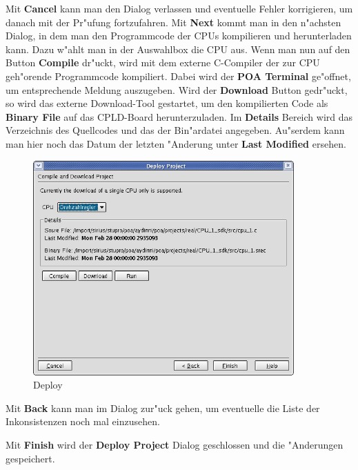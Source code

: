 \documentclass[a4paper,titlepage,12pt,ngerman]{scrbook}
\begin{document}
Mit {\bf Cancel} kann man den Dialog verlassen und eventuelle Fehler korrigieren, um danach mit der Pr"ufung fortzufahren.\newline
Mit {\bf Next} kommt man in den n"achsten Dialog, in dem man den Programmcode der CPUs kompilieren und herunterladen kann. Dazu w"ahlt man in der Auswahlbox die CPU aus. Wenn man nun auf den Button {\bf Compile} dr"uckt, wird mit dem externe C-Compiler der zur CPU geh"orende Programmcode kompiliert. Dabei wird der {\bf POA Terminal} ge"offnet, um entsprechende Meldung auszugeben. Wird der {\bf Download} Button gedr"uckt, so wird das externe Download-Tool gestartet, um den kompilierten Code als {\bf Binary File} auf das CPLD-Board herunterzuladen.
Im {\bf Details} Bereich wird das Verzeichnis des Quellcodes und das der Bin"ardatei angegeben. Au"serdem kann man hier noch das Datum der letzten "Anderung unter {\bf Last Modified} ersehen.\par
\begin{figure}[htbp]

\begin{center}

\includegraphics[width=10cm]{Deploy2}

\caption{Deploy}\label{test}

\end{center}
\end{figure}
Mit {\bf Back} kann man im Dialog zur"uck gehen, um eventuelle die Liste der Inkonsistenzen noch mal einzusehen.\par
Mit {\bf Finish} wird der {\bf Deploy Project} Dialog geschlossen und die "Anderungen gespeichert.


\end{document}
